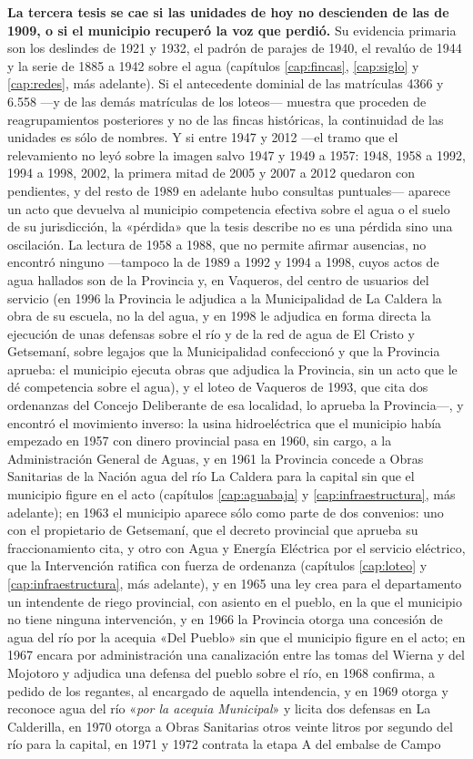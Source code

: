\textbf{La tercera tesis se cae si las unidades de hoy no descienden de las de 1909, o si el municipio recuperó la voz que perdió.} Su evidencia primaria son los deslindes de 1921 y 1932, el padrón de parajes de 1940, el revalúo de 1944 y la serie de 1885 a 1942 sobre el agua (capítulos \ref{cap:fincas}, \ref{cap:siglo} y \ref{cap:redes}, más adelante). Si el antecedente dominial de las matrículas 4366 y 6.558 ---y de las demás matrículas de los loteos--- muestra que proceden de reagrupamientos posteriores y no de las fincas históricas, la continuidad de las unidades es sólo de nombres. Y si entre 1947 y 2012 ---el tramo que el relevamiento no leyó sobre la imagen salvo 1947 y 1949 a 1957: 1948, 1958 a 1992, 1994 a 1998, 2002, la primera mitad de 2005 y 2007 a 2012 quedaron con pendientes, y del resto de 1989 en adelante hubo consultas puntuales--- aparece un acto que devuelva al municipio competencia efectiva sobre el agua o el suelo de su jurisdicción, la «pérdida» que la tesis describe no es una pérdida sino una oscilación. La lectura de 1958 a 1988, que no permite afirmar ausencias, no encontró ninguno ---tampoco la de 1989 a 1992 y 1994 a 1998, cuyos actos de agua hallados son de la Provincia y, en Vaqueros, del centro de usuarios del servicio (en 1996 la Provincia le adjudica a la Municipalidad de La Caldera la obra de su escuela, no la del agua, y en 1998 le adjudica en forma directa la ejecución de unas defensas sobre el río y de la red de agua de El Cristo y Getsemaní, sobre legajos que la Municipalidad confeccionó y que la Provincia aprueba: el municipio ejecuta obras que adjudica la Provincia, sin un acto que le dé competencia sobre el agua), y el loteo de Vaqueros de 1993, que cita dos ordenanzas del Concejo Deliberante de esa localidad, lo aprueba la Provincia---, y encontró el movimiento inverso: la usina hidroeléctrica que el municipio había empezado en 1957 con dinero provincial pasa en 1960, sin cargo, a la Administración General de Aguas, y en 1961 la Provincia concede a Obras Sanitarias de la Nación agua del río La Caldera para la capital sin que el municipio figure en el acto (capítulos \ref{cap:aguabaja} y \ref{cap:infraestructura}, más adelante); en 1963 el municipio aparece sólo como parte de dos convenios: uno con el propietario de Getsemaní, que el decreto provincial que aprueba su fraccionamiento cita, y otro con Agua y Energía Eléctrica por el servicio eléctrico, que la Intervención ratifica con fuerza de ordenanza (capítulos \ref{cap:loteo} y \ref{cap:infraestructura}, más adelante), y en 1965 una ley crea para el departamento un intendente de riego provincial, con asiento en el pueblo, en la que el municipio no tiene ninguna intervención, y en 1966 la Provincia otorga una concesión de agua del río por la acequia «Del Pueblo» sin que el municipio figure en el acto; en 1967 encara por administración una canalización entre las tomas del Wierna y del Mojotoro y adjudica una defensa del pueblo sobre el río, en 1968 confirma, a pedido de los regantes, al encargado de aquella intendencia, y en 1969 otorga y reconoce agua del río «\textit{por la acequia Municipal}» y licita dos defensas en La Calderilla, en 1970 otorga a Obras Sanitarias otros veinte litros por segundo del río para la capital, en 1971 y 1972 contrata la etapa A del embalse de Campo 